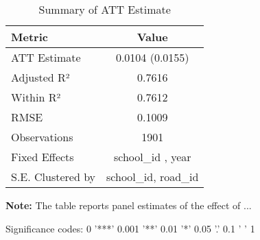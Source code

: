 \begin{table}[H]
\centering
\caption{Summary of ATT Estimate}
\label{tab:SA_cl_0p}
 \begin{center}
 \begin{tabular}{lc}
 \toprule
Metric & Value \\
\midrule
ATT Estimate & 0.0104 (0.0155) \\
\hline 
 Adjusted R² & 0.7616 \\
Within R² & 0.7612 \\
RMSE & 0.1009 \\
Observations & 1901 \\
\hline 
 Fixed Effects & school_id ,  year \\
S.E. Clustered by & school_id, road_id \\
\bottomrule
\end{tabular}
 \end{center}\begin{tablenotes}
\small
\item \textbf{Note:} The table reports panel estimates of the effect of ...
\item Significance codes: 0 '***' 0.001 '**' 0.01 '*' 0.05 '.' 0.1 ' ' 1
\end{tablenotes}
\end{table}